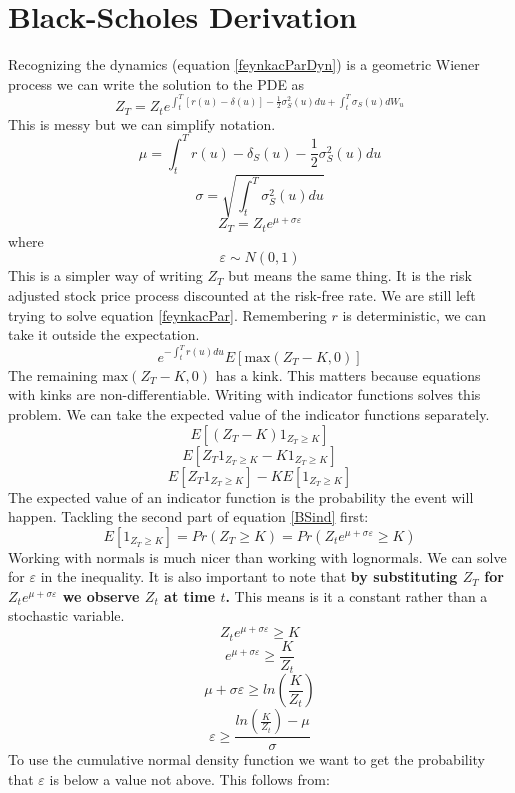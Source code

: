 
\section{Black-Scholes Derivation} \label{sec:BS}

Recognizing the dynamics (equation \ref{feynkacParDyn}) is a geometric Wiener
process we can write the solution to the PDE as
\begin{equation} \label{BSPDE}
    Z_T=Z_te^{\int_t^T\left[ r(u)-\delta(u) \right]
    -\frac{1}{2}\sigma_S^2(u)du
    + \int_t^T\sigma_S(u)dW_u}
\end{equation}
This is messy but we can simplify notation.
\[\mu=\int_t^Tr(u)-\delta_S(u)-\frac{1}{2}\sigma_S^2(u)du\]
\[\sigma=\sqrt{\int_t^T\sigma_S^2(u)du}\]
\[Z_T=Z_te^{\mu+\sigma\varepsilon}\]
where
\[\varepsilon \sim N(0,1)\]
This is a simpler way of writing $Z_T$ but means the same thing. It is the risk
adjusted stock price process discounted at the risk-free rate.
We are still left trying to solve equation \ref{feynkacPar}.
Remembering $r$ is deterministic, we can take it outside the expectation.
\[e^{-\int_t^Tr(u)du}E[\text{max}(Z_T-K,0)]\]
The remaining $\text{max}(Z_T-K,0)$ has a kink.
This matters because equations with kinks are non-differentiable.
Writing with indicator functions solves this problem.
We can take the expected value of the indicator functions separately.
\[E\left[ (Z_T-K)1_{Z_T\geq K} \right]\]
\[E\left[ Z_T1_{Z_T\geq K} - K1_{Z_T\geq K} \right]\]
\begin{equation} \label{BSind}
    E\left[ Z_T1_{Z_T\geq K} \right] - KE\left[ 1_{Z_T\geq K} \right]
\end{equation}
The expected value of an indicator function is the probability the event
will happen.
Tackling the second part of equation \ref{BSind} first:
\[
    E\left[ 1_{Z_T\geq K}\right] =Pr(Z_T\geq K) =
    Pr(Z_te^{\mu +\sigma\varepsilon}\geq K)
\]
Working with normals is much nicer than working with lognormals. We can solve
for $\varepsilon$ in the inequality. It is also important to note
that \textbf{by substituting $Z_T$ for $Z_te^{\mu+\sigma\varepsilon}$ we
observe $Z_t$ at time $t$.}
This means is it a constant rather than a stochastic variable.
\[Z_te^{\mu +\sigma\varepsilon}\geq K\]
\[e^{\mu +\sigma\varepsilon}\geq\frac{K}{Z_t}\]
\[\mu +\sigma\varepsilon\geq ln\left( \frac{K}{Z_t} \right)\]
\[\varepsilon\geq\frac{ln\left( \frac{K}{Z_t} \right)-\mu}{\sigma}\]
To use the cumulative normal density function we want to get the probability
that $\varepsilon$ is below a value not above.
This follows from:
